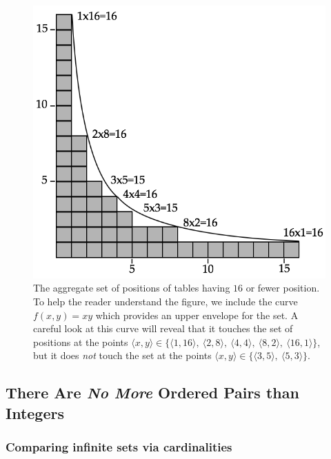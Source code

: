 \begin{figure}[htb]
\begin{center}
       \includegraphics[scale=0.4]{FiguresArithmetic/PairingHyp}
\caption{The aggregate set of positions of tables having $16$ or
    fewer position.  To help the reader understand the figure, we
    include the curve $f(x,y) = xy$ which provides an upper envelope
    for the set.  A careful look at this curve will reveal that it
    touches the set of positions at the points $\langle x,y \rangle
    \in \{ \langle 1,16 \rangle, \ \langle 2,8 \rangle, \ \langle 4,4
    \rangle, \ \langle 8,2 \rangle, \ \langle 16,1 \rangle \}$, but it
    does {\em not} touch the set at the points $\langle x,y \rangle
    \in \{ \langle 3,5 \rangle, \ \langle 5,3 \rangle \}$. 
\label{f.hyp}}
\end{center}
\end{figure}

\subsection{There Are {\em No More} Ordered Pairs than Integers}
\label{sec:cardinality-NxN}

\subsubsection{Comparing infinite sets via cardinalities}
\label{sec:compare-sets-via-card}

